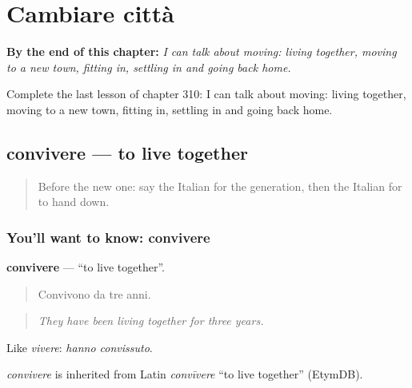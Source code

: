 
\chapter{Cambiare città}
\label{ch:it-cambiare-citta}

\begin{chapteropening}
\textbf{By the end of this chapter:} \emph{I can talk about moving: living together, moving to a new town, fitting in, settling in and going back home.}

Complete the last lesson of chapter 310: I can talk about moving: living together, moving to a new town, fitting in, settling in and going back home.
\end{chapteropening}

\section[convivere]{convivere — to live together}

\label{lesson:IT-C310-convivere}



\begin{quote}
Before the new one: say the Italian for the generation, then the Italian for to hand down.
\end{quote}

\subsection*{You'll want to know: convivere}
\textbf{convivere} — \textquotedblleft{}to live together\textquotedblright{}.

\begin{quote}
Convivono da tre anni.
\end{quote}

\begin{quote}
\emph{They have been living together for three years.}
\end{quote}

Like \emph{vivere}: \emph{hanno convissuto}.

\begin{cousinweb}
\emph{convivere} is inherited from Latin \emph{convīvere} \textquotedblleft{}to live together\textquotedblright{} (EtymDB).
\end{cousinweb}

